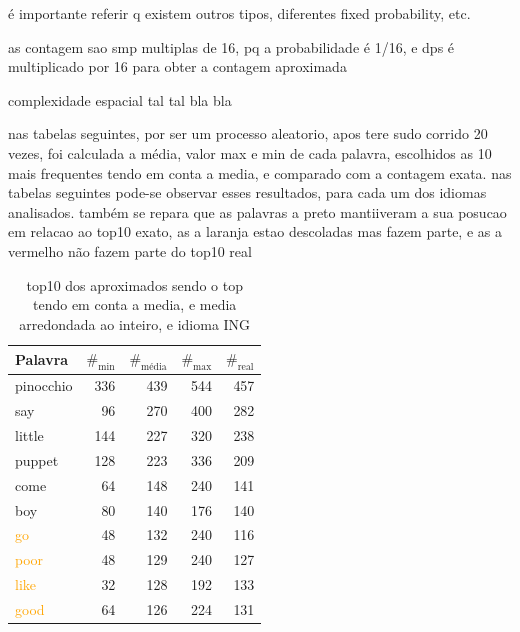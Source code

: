 \documentclass[mirror, portugues]{revdetua}
\begin{document}
é importante referir q existem outros tipos, diferentes fixed probability, etc.

as contagem sao smp multiplas de 16, pq a probabilidade é 1/16, e dps é multiplicado por 16 para obter a contagem aproximada

complexidade espacial tal tal bla bla

nas tabelas seguintes, por ser um processo aleatorio, apos tere sudo corrido 20 vezes, foi calculada a média, valor max e min de cada palavra, escolhidos as 10 mais frequentes tendo em conta a media, e comparado com a contagem exata. nas tabelas seguintes pode-se observar esses resultados, para cada um dos idiomas analisados. também se repara que as palavras a preto mantiiveram a sua posucao em relacao ao top10 exato, as a laranja estao descoladas mas fazem parte, e as a vermelho não fazem parte do top10 real

\begin{table}[H]
\centering
\caption{top10 dos aproximados sendo o top tendo em conta a media, e media arredondada ao inteiro, e idioma ING}
\label{table:top10_aprox_ingles}
\begin{tabular}{lrrr|r}
\toprule
Palavra & $\text{\#}_{\text{min}}$ & $\text{\#}_{\text{média}}$ & $\text{\#}_{\text{max}}$ & $\text{\#}_{\text{real}}$ \\
\midrule
pinocchio & 336 & 439 & 544 & 457 \\
say & 96 & 270 & 400 & 282 \\
little & 144 & 227 & 320 & 238 \\
puppet & 128 & 223 & 336 & 209 \\
come & 64 & 148 & 240 & 141 \\
boy & 80 & 140 & 176 & 140 \\
\textcolor{orange}{go} & 48 & 132 & 240 & 116 \\
\textcolor{orange}{poor} & 48 & 129 & 240 & 127 \\
\textcolor{orange}{like} & 32 & 128 & 192 & 133 \\
\textcolor{orange}{good} & 64 & 126 & 224 & 131 \\
\bottomrule
\end{tabular}
\end{table}
\end{document}
